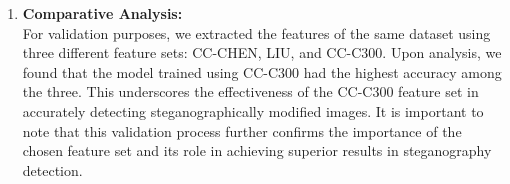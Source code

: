 \begin{enumerate}[label=\arabic*.]
    \item \textbf{Comparative Analysis:} \\
    For validation purposes, we extracted the features of the same dataset using three different feature sets: CC-CHEN, LIU, and CC-C300. Upon analysis, we found that the model trained using CC-C300 had the highest accuracy among the three. This underscores the effectiveness of the CC-C300 feature set in accurately detecting steganographically modified images. It is important to note that this validation process further confirms the importance of the chosen feature set and its role in achieving superior results in steganography detection. 

\end{enumerate}